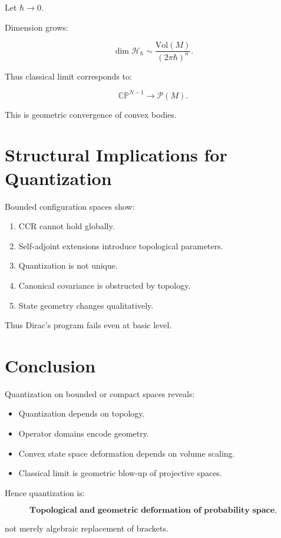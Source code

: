 \documentclass[11pt]{book}
\begin{document}
Let $\hbar \to 0$.

Dimension grows:

\[
\dim \mathcal{H}_\hbar \sim \frac{\mathrm{Vol}(M)}{(2\pi\hbar)^n}.
\]

Thus classical limit corresponds to:

\[
\mathbb{CP}^{N-1}
\to
\mathcal{P}(M).
\]

This is geometric convergence of convex bodies.

\section{Structural Implications for Quantization}

Bounded configuration spaces show:

\begin{enumerate}
\item CCR cannot hold globally.
\item Self-adjoint extensions introduce topological parameters.
\item Quantization is not unique.
\item Canonical covariance is obstructed by topology.
\item State geometry changes qualitatively.
\end{enumerate}

Thus Dirac's program fails even at basic level.

\section{Conclusion}

Quantization on bounded or compact spaces reveals:

\begin{itemize}
\item Quantization depends on topology.
\item Operator domains encode geometry.
\item Convex state space deformation depends on volume scaling.
\item Classical limit is geometric blow-up of projective spaces.
\end{itemize}

Hence quantization is:

\[
\textbf{Topological and geometric deformation of probability space,}
\]

not merely algebraic replacement of brackets.%
\end{document}
